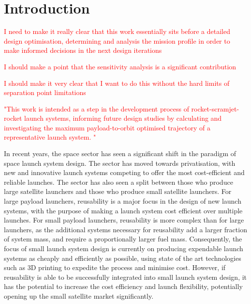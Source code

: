 
\cleardoublepage
\chapter{Introduction}
\textcolor{red}{I need to make it really clear that this work essentially sits before a detailed design optimisation, determining and analysis the mission profile in order to make informed decisions in the next design iterations}
  	
  	\textcolor{red}{I should make a point that the sensitivity analysis is a significant contribution}
  	
  	\textcolor{red}{I should make it very clear that I want to do this without the hard limits of separation point limitations}
  	
  	\textcolor{red}{"This work is intended as a step in the development process of rocket-scramjet-rocket launch systems, informing future design studies by calculating and investigating the maximum payload-to-orbit optimised trajectory of a representative launch system. "}
  	
  	
  	In recent years, the space sector has seen a significant shift in the paradigm of space launch system design. 
  	The sector has moved towards privatisation, with new and innovative launch systems competing to offer the most cost-efficient and reliable launches. 
  	The sector has also seen a split between those who produce large satellite launchers and those who produce small satellite launchers.
  	For large payload launchers, reusability is a major focus in the design of new launch systems, with the purpose of making a launch system cost efficient over multiple launches\cite{Faa2018}. 
  	For small payload launchers, reusability is more complex than for large launchers, as the additional systems necessary for reusability add a larger fraction of system mass, and require a proportionally larger fuel mass. 
  	Consequently, the focus of small launch system design is currently on producing expendable launch systems as cheaply and efficiently as possible, using state of the art technologies such as 3D printing to expedite the process and minimise cost\cite{Niederstrasser2015}.
  	However, if reusability is able to be successfully integrated into small launch system design, it has the potential to increase the cost efficiency and launch flexibility, potentially opening up the small satellite market significantly. 
  	
  	
  	
